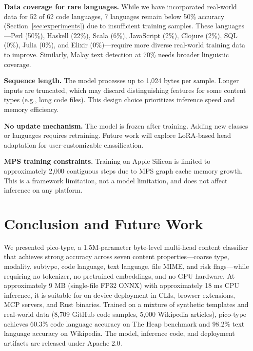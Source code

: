 \documentclass[11pt,a4paper]{article}
\begin{document}
\textbf{Data coverage for rare languages.} While we have incorporated real-world data for 52 of 62 code languages, 7 languages remain below 50\% accuracy (Section~\ref{sec:experiments}) due to insufficient training samples.
These languages---Perl (50\%), Haskell (22\%), Scala (6\%), JavaScript (2\%), Clojure (2\%), SQL (0\%), Julia (0\%), and Elixir (0\%)---require more diverse real-world training data to improve.
Similarly, Malay text detection at 70\% needs broader linguistic coverage.

\textbf{Sequence length.} The model processes up to 1,024 bytes per sample.
Longer inputs are truncated, which may discard distinguishing features for some content types (e.g., long code files).
This design choice prioritizes inference speed and memory efficiency.

\textbf{No update mechanism.} The model is frozen after training.
Adding new classes or languages requires retraining.
Future work will explore LoRA-based head adaptation for user-customizable classification.

\textbf{MPS training constraints.} Training on Apple Silicon is limited to approximately 2,000 contiguous steps due to MPS graph cache memory growth.
This is a framework limitation, not a model limitation, and does not affect inference on any platform.

\section{Conclusion and Future Work}
\label{sec:conclusion}

We presented pico-type, a 1.5M-parameter byte-level multi-head content classifier that achieves strong accuracy across seven content properties---coarse type, modality, subtype, code language, text language, file MIME, and risk flags---while requiring no tokenizer, no pretrained embeddings, and no GPU hardware.
At approximately 9 MB (single-file FP32 ONNX) with approximately 18 ms CPU inference, it is suitable for on-device deployment in CLIs, browser extensions, MCP servers, and Rust binaries.
Trained on a mixture of synthetic templates and real-world data (8,709 GitHub code samples, 5,000 Wikipedia articles), pico-type achieves 60.3\% code language accuracy on The Heap benchmark and 98.2\% text language accuracy on Wikipedia.
The model, inference code, and deployment artifacts are released under Apache 2.0.
\end{document}
